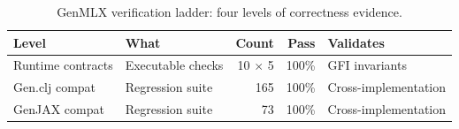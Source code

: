 \begin{table}[t]
\centering
\caption{GenMLX verification ladder: four levels of correctness evidence.}
\label{tab:verification}
\begin{tabular}{l l r r l}
\toprule
Level & What & Count & Pass & Validates \\
\midrule
Runtime contracts & Executable checks & 10 $\times$ 5 & 100\% & GFI invariants \\
Gen.clj compat & Regression suite & 165 & 100\% & Cross-implementation \\
GenJAX compat & Regression suite & 73 & 100\% & Cross-implementation \\
\bottomrule
\end{tabular}
\end{table}
